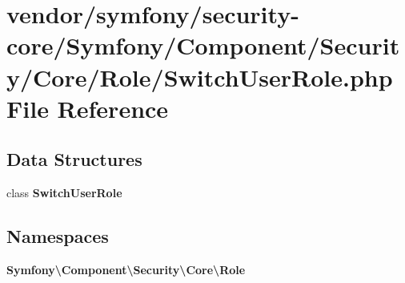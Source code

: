 \section{vendor/symfony/security-\/core/\+Symfony/\+Component/\+Security/\+Core/\+Role/\+Switch\+User\+Role.php File Reference}
\label{_switch_user_role_8php}
\subsection*{Data Structures}
\begin{DoxyCompactItemize}
\item 
class {\bf Switch\+User\+Role}
\end{DoxyCompactItemize}
\subsection*{Namespaces}
\begin{DoxyCompactItemize}
\item 
 {\bf Symfony\textbackslash{}\+Component\textbackslash{}\+Security\textbackslash{}\+Core\textbackslash{}\+Role}
\end{DoxyCompactItemize}
